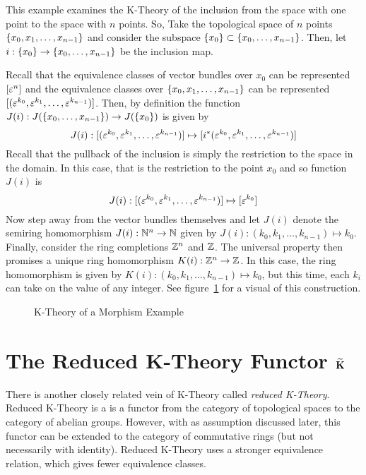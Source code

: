 \documentclass[../sean_thesis.tex]{subfiles}
\begin{document}
\begin{example}
	This example examines the K-Theory of the inclusion from the space with one point to the space with $n$ points.
	So, Take the topological space of $n$ points $\left\{x_0, x_1, \dots, x_{n-1}\right\}$ and consider the subspace $\left\{x_0\right\} \subset \left\{x_0, \dots, x_{n-1}\right\}$. Then, let $i: \left\{x_0\right\} \to \left\{x_0, \dots, x_{n-1}\right\}$ be the inclusion map.
	
	Recall that the equivalence classes of vector bundles over $x_0$ can be represented $[\varepsilon^{n}]$ and the equivalence classes over $\left\{x_0, x_1, \dots, x_{n-1}\right\}$ can be represented $[(\varepsilon^{k_0}, \varepsilon^{k_1}, \dots, \varepsilon^{k_{n-1}})]$. Then, by definition the function $J(i): J(\left\{x_0, \dots, x_{n-1}\right\}) \to J(\left\{x_0\right\})$ is given by
	\begin{equation*}
		J(i): [(\varepsilon^{k_0}, \varepsilon^{k_1}, \dots, \varepsilon^{k_{n-1}})] \mapsto [i^{*}(\varepsilon^{k_0}, \varepsilon^{k_1}, \dots, \varepsilon^{k_{n-1}})]
	\end{equation*}
	Recall that the pullback of the inclusion is simply the restriction to the space in the domain. In this case, that is the restriction to the point $x_0$ and so function $J(i)$ is
	\begin{equation*}
		J(i): [(\varepsilon^{k_0}, \varepsilon^{k_1}, \dots, \varepsilon^{k_{n-1}})] \mapsto [\varepsilon^{k_0}]
	\end{equation*}
	Now step away from the vector bundles themselves and let $J(i)$ denote the semiring homomorphism $J(i): \mathbb{N}^n \to \mathbb{N}$ given by $J(i): (k_0, k_1, \dots, k_{n-1}) \mapsto k_0$. Finally, consider the ring completions $\mathbb{Z}^n$ and $\mathbb{Z}$. The universal property then promises a unique ring homomorphism $K(i): \mathbb{Z}^n \to \mathbb{Z}$. In this case, the ring homomorphism is given by $K(i): (k_0, k_1, \dots, k_{n-1}) \mapsto k_0$, but this time, each $k_i$ can take on the value of any integer. See figure~\ref{fig:k_morphism_ex} for a visual of this construction.
\begin{figure}
	
	\caption{K-Theory of a Morphism Example}
	\label{fig:k_morphism_ex}
\end{figure}
\end{example}

\section{The Reduced K-Theory Functor $\mathbf{\widetilde{K}}$}
There is another closely related vein of K-Theory called \emph{reduced K-Theory}. Reduced K-Theory is a is a functor from the category of topological spaces to the category of abelian groups. However, with as assumption discussed later, this functor can be extended to the category of commutative rings (but not necessarily with identity). Reduced K-Theory uses a stronger equivalence relation, which gives fewer equivalence classes.
\end{document}
